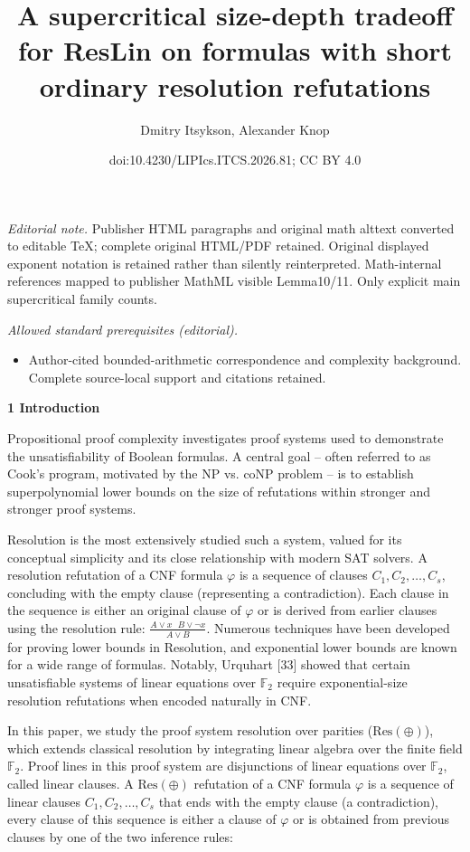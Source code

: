 \documentclass[10pt,a4paper]{article}
\title{A supercritical size-depth tradeoff for ResLin on formulas with short ordinary resolution refutations}
\author{Dmitry Itsykson, Alexander Knop}
\date{doi:10.4230/LIPIcs.ITCS.2026.81; CC BY 4.0}
\begin{document}
\maketitle
\noindent\textit{Editorial note.} Publisher HTML paragraphs and original math alttext converted to editable TeX; complete original HTML/PDF retained. Original displayed exponent notation is retained rather than silently reinterpreted. Math-internal references mapped to publisher MathML visible Lemma10/11. Only explicit main supercritical family counts.\par\medskip
\noindent\textit{Allowed standard prerequisites (editorial).}\begin{itemize}
\item Author-cited bounded-arithmetic correspondence and complexity background. Complete source-local support and citations retained.
\end{itemize}\medskip

\par\medskip\noindent\textbf{
1 Introduction}\par


Propositional proof complexity investigates proof systems used to demonstrate the unsatisfiability of Boolean formulas.
A central goal – often referred to as Cook’s program, motivated by the $\mathrm{NP}$ vs. $\mathrm{coNP}$ problem –
is to establish superpolynomial lower bounds on the size of refutations within
stronger and stronger proof systems.\par



Resolution is the most
extensively studied such a system, valued for its conceptual simplicity and its
close relationship with modern SAT solvers.
A resolution refutation of a CNF formula $\varphi$ is a sequence of clauses $C_{1},C_{2},\dots,C_{s}$,
concluding with the empty clause (representing a contradiction).
Each clause in the sequence is either an original clause of $\varphi$ or is derived from earlier clauses using
the resolution rule: $\frac{A\lor x\ \ \ B\lor\lnot x}{A\lor B}$.
Numerous techniques have been developed for proving lower bounds in Resolution, and exponential lower bounds are
known for a wide range of formulas. Notably, Urquhart [33] showed that certain unsatisfiable systems of
linear equations over $\mathbb{F}_{2}$ require exponential-size resolution refutations when encoded naturally in CNF.\par



In this paper, we study the proof system resolution over parities ($\mathrm{Res}(\oplus)$), which extends classical resolution
by integrating linear algebra over the finite field $\mathbb{F}_{2}$.
Proof lines in this proof system are disjunctions of linear equations over $\mathbb{F}_{2}$, called
linear clauses.
A $\mathrm{Res}(\oplus)$ refutation of a CNF formula $\varphi$ is a sequence of linear clauses $C_{1},C_{2},\dots,C_{s}$
that ends with the empty clause (a contradiction), every clause of this sequence is either a clause of
$\varphi$ or is obtained from previous clauses by one of the two inference rules:\par
\end{document}
